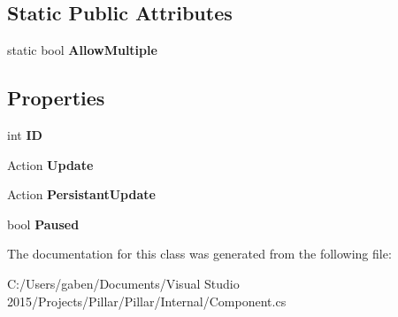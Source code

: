 \subsection*{Static Public Attributes}
\begin{DoxyCompactItemize}
\item 
\mbox{\label{class_pillar3_d_1_1_component_a292ec0044cd5c993b98693fa88682084}} 
static bool {\bfseries Allow\+Multiple}
\end{DoxyCompactItemize}
\subsection*{Properties}
\begin{DoxyCompactItemize}
\item 
\mbox{\label{class_pillar3_d_1_1_component_af1c87766c5b845e05b496ec7823184a6}} 
int {\bfseries ID}
\item 
\mbox{\label{class_pillar3_d_1_1_component_a74bee0cc3feb34def0018ba501e5411c}} 
Action {\bfseries Update}
\item 
\mbox{\label{class_pillar3_d_1_1_component_aef053db26bd22e840c8bf918bcf8c5f3}} 
Action {\bfseries Persistant\+Update}
\item 
\mbox{\label{class_pillar3_d_1_1_component_a8c79529444e423d4e951148e49bc2f33}} 
bool {\bfseries Paused}
\end{DoxyCompactItemize}


The documentation for this class was generated from the following file\+:\begin{DoxyCompactItemize}
\item 
C\+:/\+Users/gaben/\+Documents/\+Visual Studio 2015/\+Projects/\+Pillar/\+Pillar/\+Internal/Component.\+cs\end{DoxyCompactItemize}
